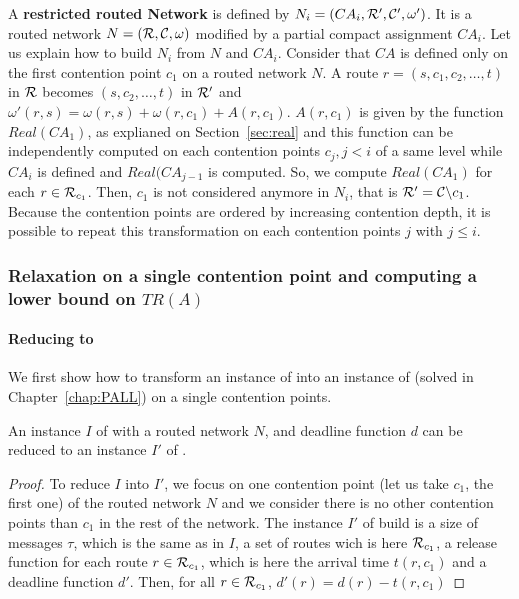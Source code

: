 A \textbf{restricted routed Network} is defined by $N_i = (CA_i,{\cal R}',{\cal C}',\omega')$. It is a routed network $N = ({\cal R},{\cal C},\omega)$ modified by a partial compact assignment $CA_i$.
Let us explain how to build $N_i$ from $N$ and $CA_i$.
Consider that $CA$ is defined only on the first contention point $c_1$ on a routed network $N$.
A route $r = (s,c_1,c_2,\ldots,t)$ in ${\cal R}$ becomes $(s,c_2,\ldots,t)$ in ${\cal R}'$ and $\omega'(r,s) = \omega(r,s)+\omega(r,c_1) + A(r,c_1)$. $A(r,c_1)$ is given by the function $Real(CA_1)$, as explianed on Section~\ref{sec:real} and this function can be independently computed on each contention points $c_j,j<i$ of a same level while $CA_i$ is defined and $Real(CA_{j-1}$ is computed. So, we compute $Real(CA_1)$ for each $r \in {\cal R}_{c_1}$. Then, $c_1$ is not considered anymore in $N_i$, that is ${\cal R}' = {\cal C} \backslash {c_1}$.\\
Because the contention points are ordered by increasing contention depth, it is possible to repeat this transformation on each contention points $j$ with $j\leq i$.

\subsubsection{Relaxation on a single contention point and computing a lower bound on $TR(A)$}



\paragraph{Reducing \spall to \wta}
We first show how to transform an instance of \spall into an instance of \wta (solved in Chapter~\ref{chap:PALL}) on a single contention points. 

\begin{lemma}\label{lemma:reduce}
An instance $I$ of \spall with a routed network $N$, and deadline function $d$ can be reduced to an instance $I'$ of \wta. 
\end{lemma}
\begin{proof}
To reduce $I$ into $I'$, we focus on one contention point (let us take $c_1$, the first one) of the routed network $N$ and we consider there is no other contention points than $c_1$ in the rest of the network. The instance $I'$ of \wta build is a size of messages $\tau$, which is the same as in $I$, a set of routes wich is here ${\cal R}_{c_1}$, a release function for each route $r \in {\cal R}_{c_1}$, which is here the arrival time $t(r,c_1)$ and a deadline function $d'$. 
 Then, for all $r \in {\cal R}_{c_1}$, $d'(r) = d(r) - t(r,c_1) $
\end{proof}


